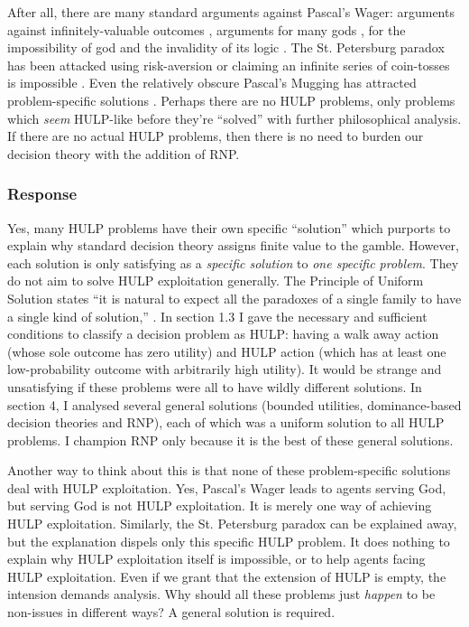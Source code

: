 \documentclass{article}
\begin{document}
After all, there are many standard arguments against Pascal's Wager: arguments against infinitely-valuable outcomes \citep{mcclennen1994pascal}, arguments for many gods \citep{saka2001pascal}, for the impossibility of god \citep{oppy1991rescher} and the invalidity of its logic \citep{hajek2003waging}. The St. Petersburg paradox has been attacked using risk-aversion \citep{weirich1984st} or claiming an infinite series of coin-tosses is impossible \citep[pg. 154]{jeffrey1990logic}. Even the relatively obscure Pascal's Mugging has attracted problem-specific solutions \citep{baumann2009counting}. Perhaps there are no HULP problems, only problems which \textit{seem} HULP-like before they're ``solved'' with further philosophical analysis. If there are no actual HULP problems, then there is no need to burden our decision theory with the addition of RNP.

\subsubsection*{Response}

Yes, many HULP problems have their own specific ``solution'' which purports to explain why standard decision theory assigns finite value to the gamble. However, each solution is only satisfying as a \textit{specific solution} to \textit{one specific problem}. They do not aim to solve HULP exploitation generally. The Principle of Uniform Solution states ``it is natural to expect all the paradoxes of a single family to have a single kind of solution,'' \citep[pg. 32]{priest1994structure}. In section 1.3 I gave the necessary and sufficient conditions to classify a decision problem as HULP: having a walk away action (whose sole outcome has zero utility) and HULP action (which has at least one low-probability outcome with arbitrarily high utility). It would be strange and unsatisfying if these problems were all to have wildly different solutions. In section 4, I analysed several general solutions (bounded utilities, dominance-based decision theories and RNP), each of which was a uniform solution to all HULP problems. I champion RNP only because it is the best of these general solutions. 

Another way to think about this is that none of these problem-specific solutions deal with HULP exploitation. Yes, Pascal's Wager leads to agents serving God, but serving God is not HULP exploitation. It is merely one way of achieving HULP exploitation. Similarly, the St. Petersburg paradox can be explained away, but the explanation dispels only this specific HULP problem. It does nothing to explain why HULP exploitation itself is impossible, or to help agents facing HULP exploitation. Even if we grant that the extension of HULP is empty, the intension demands analysis. Why should all these problems just \textit{happen} to be non-issues in different ways? A general solution is required. 
\end{document}
